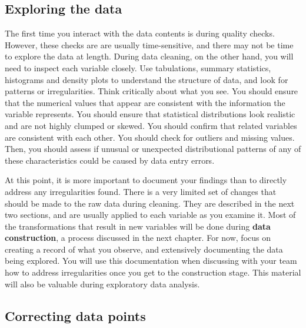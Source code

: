 \subsection{Exploring the data}

The first time you interact with the data contents is during quality checks.
However, these checks are are usually time-sensitive,
and there may not be time to explore the data at length.
During data cleaning, on the other hand,
you will need to inspect each variable closely.
Use tabulations, summary statistics, histograms and density plots to understand the structure of data,
and look for patterns or irregularities.
Think critically about what you see.
You should ensure that the numerical values that appear
are consistent with the information the variable represents.
You should ensure that statistical distributions look realistic
and are not highly clumped or skewed.
You should confirm that related variables are consistent with each other.
You should check for outliers and missing values.
Then, you should assess if unusual or unexpected distributional patterns
of any of these characteristics could be caused by data entry errors.

At this point, it is more important to document your findings
than to directly address any irregularities found.
There is a very limited set of changes that should be made to the raw data during cleaning.
They are described in the next two sections,
and are usually applied to each variable as you examine it.
Most of the transformations that result in new variables
will be done during \textbf{data construction},
a process discussed in the next chapter.
For now, focus on creating a record of what you observe,
and extensively documenting the data being explored.
You will use this documentation when discussing with your team
how to address irregularities once you get to the construction stage.
This material will also be valuable during exploratory data analysis.

\subsection{Correcting data points}

